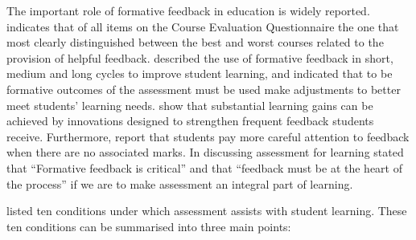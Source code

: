 The important role of formative feedback in education is widely reported. \citet{Ramsden:1992} indicates that of all items on the Course Evaluation Questionnaire \cite{Ramsden:1991} the one that most clearly distinguished between the best and worst courses related to the provision of helpful feedback. \citet{William:2006} described the use of formative feedback in short, medium and long cycles to improve student learning, and indicated that to be formative outcomes of the assessment must be used make adjustments to better meet students' learning needs. \citet{Black:1998} show that substantial learning gains can be achieved by innovations designed to strengthen frequent feedback students receive. Furthermore, \citet{Black:1998} report that students pay more careful attention to feedback when there are no associated marks. In discussing assessment for learning \citet{Brown:2004} stated that ``Formative feedback is critical'' and that ``feedback must be at the heart of the process'' if we are to make assessment an integral part of learning. 

\citet{Gibbs:2004} listed ten conditions under which assessment assists with student learning. These ten conditions can be summarised into three main points: 

